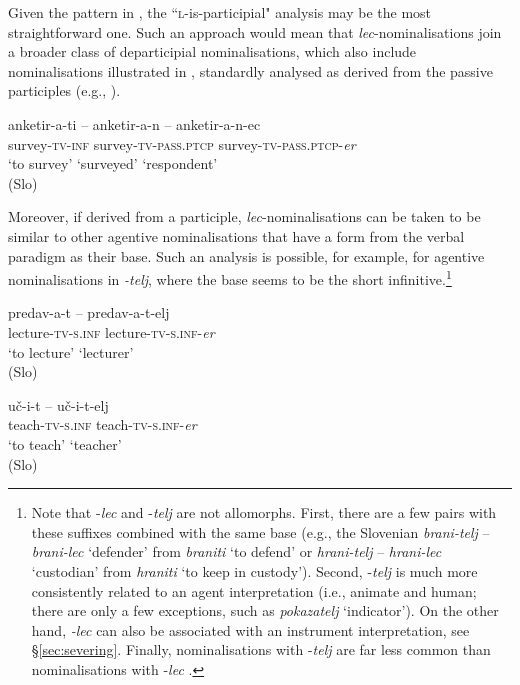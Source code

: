 \documentclass[output=paper,colorlinks,citecolor=brown]{langscibook}
\begin{document}
Given the pattern in , the ``\textsc{l}-is-participial" analysis may be the most straightforward one. Such an approach would mean that \textit{lec}-nominalisations join a broad\-er class of departicipial nominalisations, which also include nominalisations illustrated in , standardly analysed as derived from the passive participles (e.g., \citealt{sim+:toporisic2000}).

\ea \label{ex:anketiranec}
\glll anketir-a-ti -- anketir-a-n -- anketir-a-n-ec \\
        survey-\textsc{tv}-\textsc{inf} {} survey-\textsc{tv}-\textsc{pass.ptcp} {} survey-\textsc{tv}-\textsc{pass.ptcp}-\textit{er} {} %
        \\
 {`to survey'} {} {`surveyed'} {} `respondent' {} \\\hfill (Slo)
\z

\noindent Moreover, if derived from a participle, \textit{lec}-nominalisations can be taken to be similar to other agentive nominalisations that have a form from the verbal paradigm as their base. Such an analysis is possible, for example, for agentive  nominalisations in \textit{-telj}, where the base seems to be the short infinitive.\footnote{Note that -\textit{lec} and -\textit{telj} are not allomorphs. First, there are a few pairs with these suffixes combined with the same base (e.g., the Slovenian \textit{brani-telj} -- \textit{brani-lec} `defender' from \textit{braniti} `to defend' or \textit{hrani-telj} -- \textit{hrani-lec} `custodian' from \textit{hraniti} `to keep in custody'). Second,  -\textit{telj} is much more consistently related to an agent interpretation (i.e., animate and human; there are only a few exceptions, such as \textit{pokazatelj} `indicator'). On the other hand, \textit{-lec} can also be associated with an instrument interpretation, see \S \ref{sec:severing}. Finally, nominalisations with -\textit{telj} are far less common than nominalisations with -\textit{lec} \citep[see][]{sim+:WeSoSlaV}. }



\ea \label{ex:predavatlj}
\glll predav-a-t -- predav-a-t-elj \\
        lecture-\textsc{tv}-\textsc{s.inf} {} lecture-\textsc{tv}-\textsc{s.inf}-\textit{er} {} 
        \\
 {`to lecture'} {} `lecturer' {} \\\hfill (Slo)
\z

\ea \label{ex:ucitlj}
\glll uč-i-t -- uč-i-t-elj  \\
        teach-\textsc{tv}-\textsc{s.inf} {} teach-\textsc{tv}-\textsc{s.inf}-\textit{er} {} 
        \\
 {`to teach'} {} `teacher' {} \\\hfill (Slo)
\z
\end{document}
